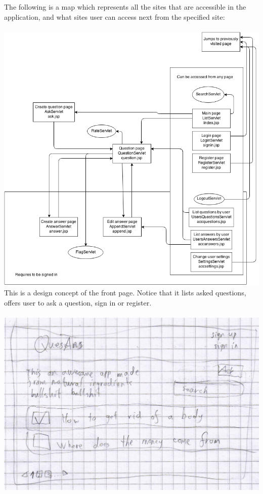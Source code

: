 \documentclass[a4paper,12pt]{article}
\begin{document}
The following is a map which represents all the sites that are accessible in the application, and what sites user can access next from the specified site:\\
\\
\includegraphics[scale=0.55]{sitemap2}\\
\newpage
This is a design concept of the front page. Notice that it lists asked questions, offers user to ask a question, sign in or register.\\
\\
\includegraphics[scale=0.9]{FrontPage}
\newpage
\end{document}
